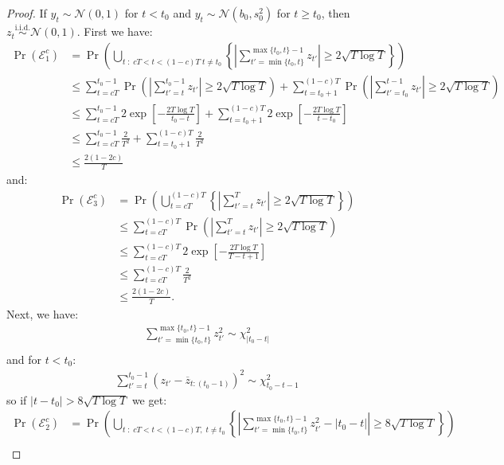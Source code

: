 \begin{proof}
If $y_t \sim \mathcal{N}(0,1)$ for $t < t_0$ and $y_t \sim \mathcal{N}(b_0,s^2_0)$ for $t \geq t_0$, then $z_t \overset{\text{i.i.d.}}{\sim} \mathcal{N}(0,1)$. First we have:
\small
\begin{align*}
    \Pr(\mathcal{E}^c_1) &= \Pr\left(\bigcup_{t \;:\; cT < t < (1-c)T\; t \neq t_0} \left\{\left|\sum_{t'=\min\{t_0,t\}}^{\max\{t_0,t\}-1} z_{t'}\right| \geq 2\sqrt{T \log T} \right\} \right) \\
    &\leq \sum_{t = cT}^{t_0 - 1} \Pr\left(\left|\sum_{t'=t}^{t_0-1} z_{t'}\right| \geq 2\sqrt{T \log T} \right) + \sum_{t = t_0+1}^{(1-c)T} \Pr\left(\left|\sum_{t'=t_0}^{t-1} z_{t'}\right| \geq 2\sqrt{T \log T} \right) \tag{union bound} \\
    &\leq \sum_{t = cT}^{t_0 - 1} 2\exp\left[-\frac{2 T\log T}{t_0-t}\right] + \sum_{t = t_0+1}^{(1-c)T} 2\exp\left[-\frac{2 T\log T}{t-t_0}\right] \tag{Chernoff bound} \\
    &\leq \sum_{t = cT}^{t_0 - 1} \frac{2}{T^2}  + \sum_{t = t_0+1}^{(1-c)T} \frac{2}{T^2} \tag{$T > |t_0-t|$} \\
    &\leq \frac{2(1-2c)}{T}
\end{align*}
\normalsize
and:
\small
\begin{align*}
    \Pr(\mathcal{E}^c_3) &= \Pr\left(\bigcup_{t= cT}^{(1-c)T} \left\{\left|\sum_{t'=t}^T z_{t'}\right| \geq 2\sqrt{T \log T} \right\} \right) \\
    &\leq \sum_{t = cT}^{(1-c)T} \Pr\left(\left|\sum_{t'=t}^T z_{t'}\right| \geq 2\sqrt{T \log T} \right)\tag{union bound} \\
    &\leq \sum_{t = cT}^{(1-c)T}  2\exp\left[-\frac{2 T\log T}{T-t+1}\right] \tag{Chernoff bound} \\
    &\leq \sum_{t = cT}^{(1-c)T}  \frac{2}{T^2}  \tag{$T > T-t+1$} \\
    &\leq \frac{2(1-2c)}{T}.
\end{align*}
\normalsize
Next, we have:
\begin{align*}
    \sum_{t'=\min\{t_0,t\}}^{\max\{t_0,t\}-1} z_{t'}^2 \sim \chi^2_{|t_0-t|} \\
\end{align*}
and for $t < t_0$:
\begin{align*}
    \sum_{t'=t}^{t_0-1} (z_{t'} - \overline{z}_{t:(t_0-1)})^2 \sim \chi^2_{t_0-t-1}
\end{align*}
so if $|t-t_0| > 8\sqrt{T\log T}$ we get:
\small
\begin{align*}
    \Pr(\mathcal{E}^c_2) &= \Pr\left(\bigcup_{t \;:\; cT < t < (1-c)T,\; t \neq t_0}  \left\{\left|\sum_{t'=\min\{t_0,t\}}^{\max\{t_0,t\}-1} z_{t'}^2 - |t_0-t| \right| \geq 8\sqrt{T \log T} \right\} \right) \\

\end{align*}
\end{proof}
